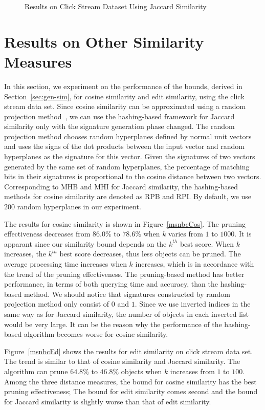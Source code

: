 \begin{figure}[htb]
\caption{Results on Click Stream Dataset Using Jaccard Similarity}
\label{csData}
\end{figure}

\section{Results on Other Similarity Measures}
\label{sec:other-measure}
In this section, we experiment on the performance of the bounds, derived in Section~\ref{sec:gen-sim}, for cosine similarity and edit similarity, using the click stream data set.  Since cosine similarity can be approximated using a random projection method~\cite{C02}, we can use the hashing-based framework for Jaccard similarity only with the signature generation phase changed. The random projection method chooses random hyperplanes defined by normal unit vectors and uses the signs of the dot products between the input vector and random hyperplanes as the signature for this vector. Given the signatures of two vectors generated by the same set of random hyperplanes, the percentage of matching bits in their signatures is proportional to the cosine distance between two vectors. Corresponding to MHB and MHI for Jaccard similarity, the hashing-based methods for cosine similarity are denoted as RPB and RPI. By default, we use $200$ random hyperplanes in our experiment.

The results for cosine similarity is shown in Figure~\ref{msnbcCos}.  The pruning effectiveness decreases from $86.0\%$ to $78.6\%$ when $k$ varies from $1$ to $1000$.  It is apparant since our similarity bound depends on the $k^{th}$ best score.  When $k$ increases, the $k^{th}$ best score decreases, thus less objects can be pruned. The average processing time increases when $k$ increases, which is in accordance with the trend of the pruning effectiveness. The pruning-based method has better performance, in terms of both querying time and accuracy, than the hashing-based method. We should notice that signatures constructed by random projection method only consist of $0$ and $1$. Since we use inverted indices in the same way as for Jaccard similarity, the number of objects in each inverted list would be very large. It can be the reason why the performance of the hashing-based algorithm becomes worse for cosine similarity.  

Figure~\ref{msnbcEd} shows the results for edit similarity on click stream data set. The trend is similar to that of cosine similarity and Jaccard similarity.  The algorithm can prune $64.8\%$ to $46.8\%$ objects when $k$ increases from $1$ to $100$.  Among the three distance measures, the bound for cosine similarity has the best pruning effectiveness; The bound for edit similarity comes second and the bound for Jaccard similarity is slightly worse than that of edit similarity.   
     
